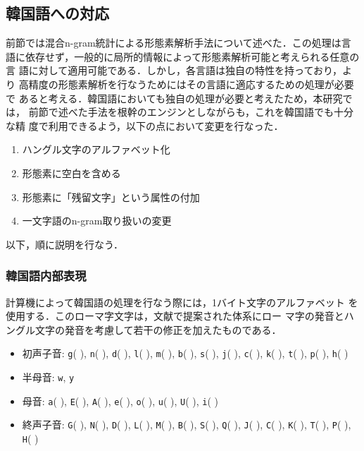 \subsection{韓国語への対応}

前節では混合n-gram統計による形態素解析手法について述べた．この処理は言
語に依存せず，一般的に局所的情報によって形態素解析可能と考えられる任意の言
語に対して適用可能である．しかし，各言語は独自の特性を持っており，より
高精度の形態素解析を行なうためにはその言語に適応するための処理が必要で
あると考える．韓国語においても独自の処理が必要と考えたため，本研究では，
前節で述べた手法を根幹のエンジンとしながらも，これを韓国語でも十分な精
度で利用できるよう，以下の点において変更を行なった．

\begin{enumerate}
\item ハングル文字のアルファベット化
\item 形態素に空白を含める
\item 形態素に「残留文字」という属性の付加
\item 一文字語のn-gram取り扱いの変更
\end{enumerate}

以下，順に説明を行なう．

\subsubsection{韓国語内部表現}
\label{節:内部表現}

計算機によって韓国語の処理を行なう際には，1バイト文字のアルファベット
を使用する．このローマ字文字は，文献\cite{DBkim}で提案された体系にロー
マ字の発音とハングル文字の発音を考慮して若干の修正を加えたものである．

\begin{itemize}
\item 初声子音: {\tt g}(
), {\tt n}(
), {\tt d}(
), {\tt l}(
),
  {\tt m}(
), {\tt b}(
), {\tt s}(
), {\tt j}(
), {\tt c}(
),
  {\tt k}(
), {\tt t}(
), {\tt p}(
), {\tt h}(
)
\item 半母音: {\tt w}, {\tt y}
\item 母音: {\tt a}(
), {\tt E}(
), {\tt A}(
), {\tt e}(
),
  {\tt o}(
), {\tt u}(
), {\tt U}(
), {\tt i}(
)
\item 終声子音: {\tt G}(
), {\tt N}(
), {\tt D}(
), {\tt L}(
),
  {\tt M}(
), {\tt B}(
), {\tt S}(
), {\tt Q}(
), {\tt J}(
),
  {\tt C}(
), {\tt K}(
), {\tt T}(
), {\tt P}(
), {\tt H}(
)
\end{itemize}

